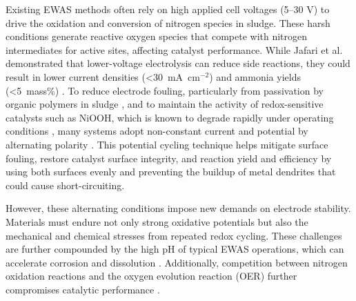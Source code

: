 \documentclass[journal=jacsat,manuscript=article]{achemso}
\begin{document}
Existing EWAS methods often rely on high applied cell voltages (5–30 V) to drive the oxidation and conversion of nitrogen species in sludge. These harsh conditions generate reactive oxygen species that compete with nitrogen intermediates for active sites, affecting catalyst performance. While Jafari et al. \cite{JafariElectrochemicalProduction} demonstrated that lower-voltage electrolysis can reduce side reactions, they could result in lower current densities (<30~mA~cm$^{-2}$) and ammonia yields (<5~mass\%) \cite{Zhao2022AAmmonia}. To reduce electrode fouling, particularly from passivation by organic polymers in sludge \cite{Wang2014InCatalysts}, and to maintain the activity of redox-sensitive catalysts such as NiOOH, which is known to degrade rapidly under operating conditions \cite{JafariElectrochemicalProduction}, many systems adopt non-constant current and potential by alternating polarity \cite{Schotten2021AlternatingSynthesis, Hall2020SustainablePrinciples, Chandrasekar2008PulseApplications, Larson2012CurrentReview, Adamson2017ProbingVoltammetry}. This potential cycling technique helps mitigate surface fouling, restore catalyst surface integrity, and reaction yield and efficiency by using both surfaces evenly and preventing the buildup of metal dendrites that could cause short-circuiting. 

However, these alternating conditions impose new demands on electrode stability. Materials must endure not only strong oxidative potentials but also the mechanical and chemical stresses from repeated redox cycling. These challenges are further compounded by the high pH of typical EWAS operations, which can accelerate corrosion and dissolution \cite{Sanchis2022NitrateOverview, Popov2015ThermodynamicsCorrosion, Kapaka2010ElectrochemicalElectrode, Mucalo2004InSolutions, Aksu2001ElectrochemistrySolutions, OConnor2018ElectrochemicalSolutions}. Additionally, competition between nitrogen oxidation reactions and the oxygen evolution reaction (OER) further compromises catalytic performance \cite{Li2021Ru-DopedNitrate, Wang2022ElectrochemicalOxidation, Dai2020ElectrochemicalOxides}.
\end{document}
